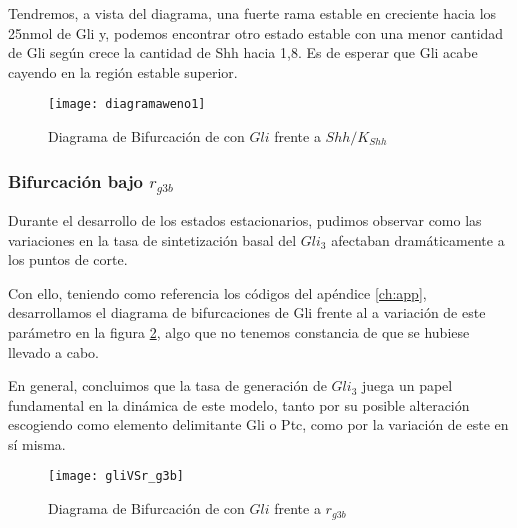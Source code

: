 Tendremos, a vista del diagrama, una fuerte rama estable en creciente hacia los 25nmol de Gli y, podemos encontrar otro estado estable con una menor cantidad de Gli según crece la cantidad de Shh hacia 1,8. Es de esperar que Gli acabe cayendo en la región estable superior.

\begin{figure}[h]
	\texttt{[image: diagramaweno1]}
	\centering
	\caption{Diagrama de Bifurcación de \cite{schaffer} con $Gli$ frente a $Shh/K_{Shh}$}
	\label{lai_12}
\end{figure}



\subsubsection{Bifurcación bajo $r_{g3b}$}
Durante el desarrollo de los estados estacionarios, pudimos observar como las variaciones en la tasa de sintetización basal del $Gli_3$ afectaban dramáticamente a los puntos de corte.

 Con ello, teniendo como referencia los códigos del apéndice \ref{ch:app}, desarrollamos el diagrama de bifurcaciones de Gli frente al a variación de este parámetro  en la figura \ref{lai_2}, algo que no tenemos constancia de que se hubiese llevado a cabo.

 En general, concluimos que la tasa de generación de $Gli_3$ juega un papel fundamental en la dinámica de este modelo, tanto por su posible alteración escogiendo como elemento delimitante Gli o Ptc, como por la variación de este en sí misma. 
 
\begin{figure}[h]
	\texttt{[image: gliVSr\_g3b]}
	\centering
	\caption{Diagrama de Bifurcación de \cite{schaffer} con $Gli$ frente a $r_{g3b}$}
	\label{lai_2}
\end{figure}

